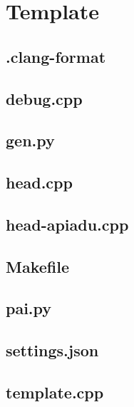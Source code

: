 \section{Template}

\subsection{.clang-format}


\subsection{debug.cpp}


\subsection{gen.py}


\subsection{head.cpp}


\subsection{head-apiadu.cpp}


\subsection{Makefile}


\subsection{pai.py}


\subsection{settings.json}


\subsection{template.cpp}


